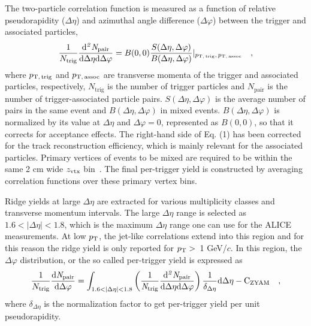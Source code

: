 The two-particle correlation function is measured as a function of relative pseudorapidity ($\Delta\eta$) and azimuthal angle difference ($\Delta\varphi$) between the trigger and associated particles,
\begin{eqnarray}
\frac{1}{N_{\rm{trig}}} \frac{ \rm{d}\it{}^{2} N_{\rm{pair}} }{ \rm{d} \Delta\eta \rm{d}\Delta\varphi} = B(0, 0)\frac{S(\Delta\eta, \Delta\varphi)}{B(\Delta\eta, \Delta\varphi)}  \lvert_{p_\mathrm{T,\,trig},\,p_\mathrm{T,\,assoc}}  \quad,
\label{eq:corrfunction}
\end{eqnarray}
where $p_\mathrm{T,\,trig}$ and $p_\mathrm{T,\,assoc}$ are transverse momenta of the trigger and associated particles, respectively, $N_\mathrm{trig}$ is the number of trigger particles and $N_\mathrm{pair}$ is the number of trigger-associated particle pairs. 
$S (\Delta\eta, \Delta\varphi)$ is the average number of pairs in the same event and $B(\Delta\eta, \Delta\varphi)$ in mixed events. $B(\Delta\eta, \Delta\varphi)$ is normalized by its value at $\Delta\eta$ and $\Delta\varphi = 0$, represented as $B (0,0)$, so that it corrects for acceptance effects. The right-hand side of Eq. (1) has been corrected for the track reconstruction efficiency, which is mainly relevant for the associated particles. Primary vertices of events to be mixed are required to be within the same 2 cm wide $z_{\rm{vtx}}$ bin~\cite{KOPYLOV1974472:evtmixing}. The final per-trigger yield is constructed by averaging correlation functions over these primary vertex bins.

Ridge yields at large $\Delta\eta$ are extracted for various multiplicity classes and transverse momentum intervals. The large $\Delta\eta$ range is selected as $1.6<|\Delta\eta|<1.8$,  which is the maximum $\Delta\eta$ range one can use for the ALICE measurements. At low $p_\mathrm{T}$, the jet-like correlations extend into this region and for this reason the ridge yield is only reported for $p_\mathrm{T}>$~1 GeV/$c$. In this region, the $\Delta\varphi$ distribution, or the so called per-trigger yield is expressed as
\begin{eqnarray}
\frac{1}{N_{\rm{trig}}} \frac{ \rm{d}\it{}N_{\rm{pair}} }{ \rm{d}\Delta\varphi } = \int_{1.6<|\Delta \eta|<1.8} \left( \frac{1}{\it{N}_{\rm{trig}}} \frac{ \rm{d}\it{}^{2} N_{\rm{pair}} }{ \rm{d}\Delta\eta d\Delta\varphi} \right) \dfrac{1}{\delta_{\Delta\eta}} \rm{d}\Delta \eta - C_{\rm{ZYAM}} \quad,
\end{eqnarray}
where $\delta_{\Delta\eta}$ is the normalization factor to get per-trigger yield per unit pseudorapidity. 

